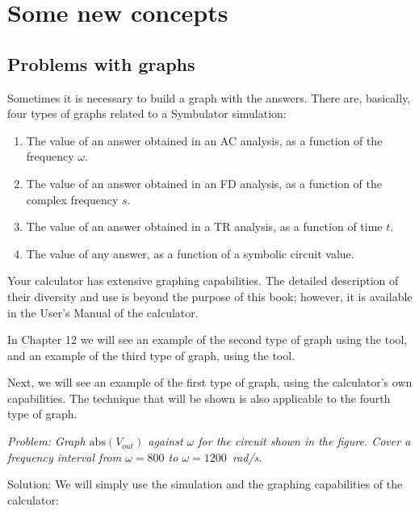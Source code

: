 
\chapter{Some new concepts}

\section{Problems with graphs}

Sometimes it is necessary to build a graph with the answers. There
are, basically, four types of graphs related to a Symbulator
simulation:

\begin{enumerate}
\item The value of an answer obtained in an AC analysis, as a
  function of the frequency $\omega$.
\item The value of an answer obtained in an FD analysis, as a
  function of the complex frequency $s$.
\item The value of an answer obtained in a TR analysis, as a
  function of time $t$.
\item The value of any answer, as a function of a symbolic circuit
  value.
\end{enumerate}

Your calculator has extensive graphing capabilities. The detailed
description of their diversity and use is beyond the purpose of this
book; however, it is available in the User's Manual of the
calculator.

In Chapter 12 we will see an example of the second type of graph
using the  tool, and an example of the third type of
graph, using the  tool.

Next, we will see an example of the first type of graph, using the
calculator's own capabilities. The technique that will be shown is
also applicable to the fourth type of graph.


\emph{Problem: Graph $\mathrm{abs}(V_{out})$ against $\omega$ for
the circuit shown in the figure. Cover a frequency interval from
$\omega = 800$ to $\omega = 1200$~rad/s.}

Solution: We will simply use the simulation and the graphing
capabilities of the calculator:


